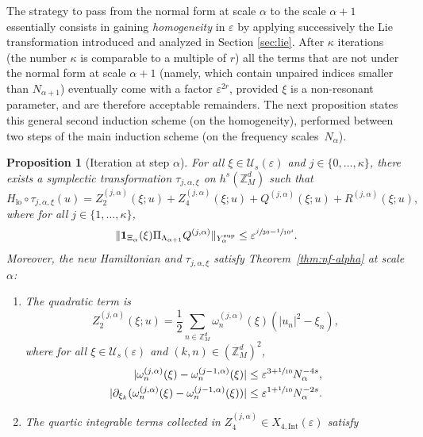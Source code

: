 \documentclass[JEP,XML,SOM,Unicode,published]{cedram}
\theoremstyle{plain}
\newtheorem{proposition}[theorem]{Proposition}
\theoremstyle{definition}
\DeclareMathOperator{\lo}{lo}
\newcommand{\Z}{\mathbb{Z}}
\newcommand{\1}{\mathbf{1}}
\newcommand{\Ysup}[1]{Y_{#1}^{\mathrm{sup}}}
\let\epsilon\varepsilon
\begin{document}
The strategy to pass from the normal form at scale $\alpha$ to the scale $\alpha+1$ essentially consists in gaining {\it homogeneity} in $\epsilon$ by applying successively the Lie transformation introduced and analyzed in Section \ref{sec:lie}. After $\kappa$ iterations (the number $\kappa$ is comparable to a multiple of $r$) all the terms that are not under the normal form at scale $\alpha+1$ (namely, which contain unpaired indices smaller than $N_{\alpha+1}$) eventually come with a factor $\epsilon^{2r}$, provided $\xi$ is a non-resonant parameter, and are therefore acceptable remainders. The next proposition states this general second induction scheme (on the homogeneity), performed between two steps of the main induction scheme (on the frequency scales~$N_{\alpha}$).
\begin{proposition}[Iteration at step $\alpha$]
\label{prop:it-j}
For all $\xi\in\mathcal{U}_{s}(\epsilon)$ and $j\in\{0,\dots,\kappa\}$, there exists a symplectic transformation $\tau_{j,\alpha,\xi}$ on $h^{s}(\Z_{M}^{d})$ such that\vspace*{-3pt}
\[
H_{\lo}\circ\tau_{j,\alpha,\xi}(u)
=Z_{2}^{(j,\alpha)}(\xi;u) + Z_{4}^{(j,\alpha)}(\xi;u)+Q^{(j,\alpha)}(\xi;u)+R^{(j,\alpha)}(\xi;u),
\]
where for all $j\in\{1,\dots,\kappa\}$,\vspace*{-3pt}
\begin{equation}
\label{eq:it-alpha-2}
\|\mathbf{1}_{\Xi_{\alpha}}(\xi)\Pi_{\Lambda_{\alpha+1}}Q^{(j,\alpha)}\|_{\Ysup{\alpha}} \leq \epsilon^{\sfrac{j}{30}-\sfrac{1}{10^{4}}}.
\end{equation}
Moreover, the new Hamiltonian and $\tau_{j,\alpha,\xi}$ satisfy Theorem~\ref{thm:nf-alpha} at scale $\alpha$:
\begin{enumerate}
\item The quadratic term is\vspace*{-3pt}
\[
Z_{2}^{(j,\alpha)}(\xi;u) = \frac{1}{2}\sum_{n\in\Z_{M}^{d}}\omega_{n}^{(j,\alpha)}(\xi)(|u_n|^{2}-\xi_{n}),
\]
where for all $\xi\in\mathcal{U}_{s}(\epsilon)$ and $(k,n)\in(\Z_{M}^{d})^{2}$,\vspace*{-3pt}
\begin{align}
\label{eq:j-omega}
|\omega_{n}^{(j,\alpha)}(\xi)-\omega_{n}^{(j-1,\alpha)}(\xi)|
&\leq
\epsilon^{3+\sfrac{1}{10}}
N_{\alpha}^{-4s},\\
\label{eq:j-domega}
|
\partial_{\xi_{k}}
(\omega_{n}^{(j,\alpha)}(\xi) -
\omega_{n}^{(j-1,\alpha)}(\xi))
|
&\leq \epsilon^{1+\sfrac{1}{10}}N_{\alpha}^{-2s}.
\end{align}
\item The quartic integrable terms collected in $Z_{4}^{(j,\alpha)}\in X_{4,\mathrm{Int}}(\epsilon)$ satisfy\vspace*{-3pt}

\end{enumerate}
\end{proposition}
\end{document}
